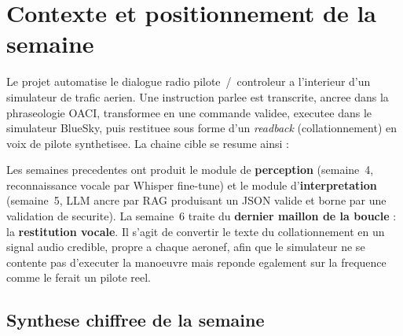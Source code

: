 \documentclass[11pt,a4paper]{article}
\begin{document}
\tableofcontents
\thispagestyle{fancy}
\vspace{1cm}

\section{Contexte et positionnement de la semaine}

Le projet automatise le dialogue radio pilote~/~controleur a l'interieur d'un
simulateur de trafic aerien. Une instruction parlee est transcrite, ancree dans la
phraseologie OACI, transformee en une commande validee, executee dans le simulateur
BlueSky, puis restituee sous forme d'un \emph{readback} (collationnement) en voix de
pilote synthetisee. La chaine cible se resume ainsi :

\begin{center}
\end{center}

Les semaines precedentes ont produit le module de \textbf{perception} (semaine~4,
reconnaissance vocale par Whisper fine-tune) et le module d'\textbf{interpretation}
(semaine~5, LLM ancre par RAG produisant un JSON valide et borne par une validation
de securite). La semaine~6 traite du \textbf{dernier maillon de la boucle} : la
\textbf{restitution vocale}. Il s'agit de convertir le texte du collationnement en
un signal audio credible, propre a chaque aeronef, afin que le simulateur ne se
contente pas d'executer la manoeuvre mais reponde egalement sur la frequence comme
le ferait un pilote reel.

\subsection{Synthese chiffree de la semaine}
\end{document}
